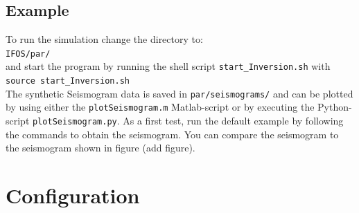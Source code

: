 \documentclass[pdftex,a4paper,parskip,listof=totoc,bibliography=totoc,onehalfspacing,12pt]{scrreprt}
\newcommand{\shellcmd}[1]{\indent\indent\texttt{#1}}	%
\newcommand{\shellcmdline}[1]{\indent\indent\texttt{\quad#1}} 	%
\begin{document}
\subsection{Example}

To run the simulation change the directory to: \\\shellcmdline{IFOS/par/}\\
and start the program by running the shell script \shellcmd{start\_Inversion.sh} with  \\\shellcmdline{source start\_Inversion.sh}\\

The synthetic Seismogram data is saved in \shellcmd{par/seismograms/} and can be plotted by using either the \shellcmd{plotSeismogram.m} Matlab-script or by executing the Python-script \shellcmd{plotSeismogram.py}.
As a first test, run the default example by following the commands to obtain the seismogram. You can compare the seismogram to the seismogram shown in figure (add figure).


\section{Configuration}\label{sec:config}
\end{document}
